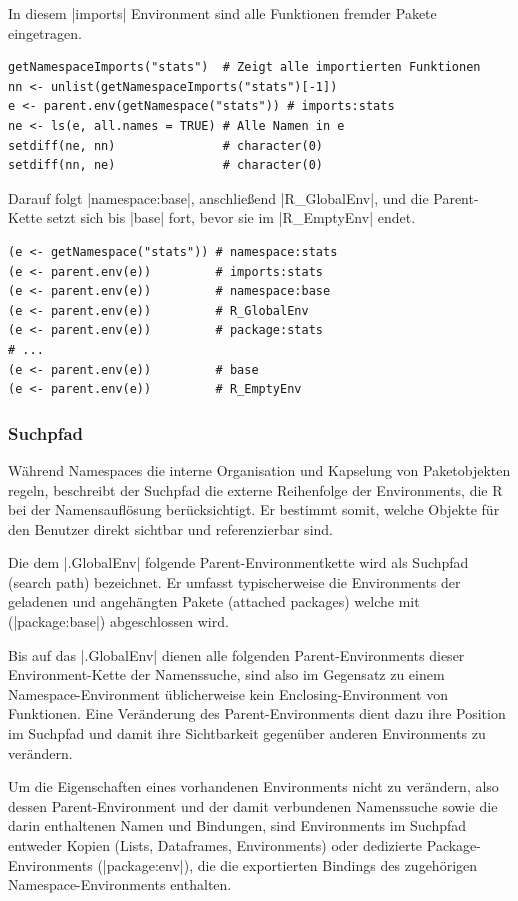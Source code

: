\documentclass[10pt,twocolumn]{scrartcl}
\renewcommand{\lstinline}{\mycoloredinline}
\begin{document}
In diesem \lstinline|imports| Environment sind alle Funktionen fremder Pakete eingetragen.

\begin{lstlisting}
getNamespaceImports("stats")  # Zeigt alle importierten Funktionen
nn <- unlist(getNamespaceImports("stats")[-1])
e <- parent.env(getNamespace("stats")) # imports:stats
ne <- ls(e, all.names = TRUE) # Alle Namen in e
setdiff(ne, nn)               # character(0)
setdiff(nn, ne)               # character(0)
\end{lstlisting}

Darauf folgt \lstinline|namespace:base|, anschließend \lstinline|R_GlobalEnv|, und die Parent-Kette setzt sich bis \lstinline|base| fort, bevor sie im \lstinline|R_EmptyEnv| endet.

\begin{lstlisting}
(e <- getNamespace("stats")) # namespace:stats
(e <- parent.env(e))         # imports:stats
(e <- parent.env(e))         # namespace:base
(e <- parent.env(e))         # R_GlobalEnv
(e <- parent.env(e))         # package:stats
# ...
(e <- parent.env(e))         # base
(e <- parent.env(e))         # R_EmptyEnv
\end{lstlisting}


\subsubsection{Suchpfad}

Während Namespaces die interne Organisation und Kapselung von Paketobjekten regeln, beschreibt der Suchpfad die externe Reihenfolge der Environments, die R bei der Namensauflösung berücksichtigt. Er bestimmt somit, welche Objekte für den Benutzer direkt sichtbar und referenzierbar sind.

Die dem \lstinline|.GlobalEnv| folgende Parent-Environmentkette wird als Suchpfad (search path) bezeichnet. Er umfasst typischerweise die Environments der geladenen und angehängten Pakete (attached packages) welche mit (\lstinline|package:base|) abgeschlossen wird.

Bis auf das \lstinline|.GlobalEnv| dienen alle folgenden Parent-Environments dieser Environment-Kette der Namenssuche, sind also im Gegensatz zu einem Namespace-Environment üblicherweise kein Enclosing-Environment von Funktionen. Eine Veränderung des Parent-Environments dient dazu ihre Position im Suchpfad und damit ihre Sichtbarkeit gegenüber anderen Environments zu verändern.

Um die Eigenschaften eines vorhandenen Environments nicht zu verändern, also dessen Parent-Environment und der damit verbundenen Namenssuche sowie die darin enthaltenen Namen und Bindungen, sind Environments im Suchpfad entweder Kopien (Lists, Dataframes, Environments) oder dedizierte Package-Environments (\lstinline|package:env|), die die exportierten Bindings des zugehörigen Namespace-Environments enthalten.
\end{document}
